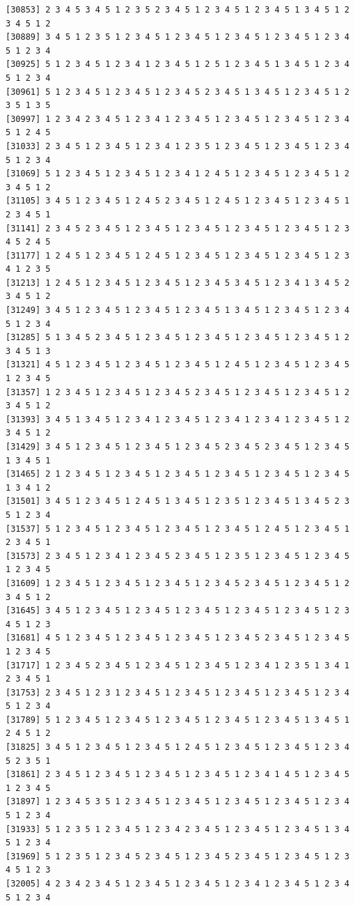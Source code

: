 \documentclass[
  english,
]{book}
\begin{document}
\begin{verbatim}
[30853] 2 3 4 5 3 4 5 1 2 3 5 2 3 4 5 1 2 3 4 5 1 2 3 4 5 1 3 4 5 1 2 3 4 5 1 2
[30889] 3 4 5 1 2 3 5 1 2 3 4 5 1 2 3 4 5 1 2 3 4 5 1 2 3 4 5 1 2 3 4 5 1 2 3 4
[30925] 5 1 2 3 4 5 1 2 3 4 1 2 3 4 5 1 2 5 1 2 3 4 5 1 3 4 5 1 2 3 4 5 1 2 3 4
[30961] 5 1 2 3 4 5 1 2 3 4 5 1 2 3 4 5 2 3 4 5 1 3 4 5 1 2 3 4 5 1 2 3 5 1 3 5
[30997] 1 2 3 4 2 3 4 5 1 2 3 4 1 2 3 4 5 1 2 3 4 5 1 2 3 4 5 1 2 3 4 5 1 2 4 5
[31033] 2 3 4 5 1 2 3 4 5 1 2 3 4 1 2 3 5 1 2 3 4 5 1 2 3 4 5 1 2 3 4 5 1 2 3 4
[31069] 5 1 2 3 4 5 1 2 3 4 5 1 2 3 4 1 2 4 5 1 2 3 4 5 1 2 3 4 5 1 2 3 4 5 1 2
[31105] 3 4 5 1 2 3 4 5 1 2 4 5 2 3 4 5 1 2 4 5 1 2 3 4 5 1 2 3 4 5 1 2 3 4 5 1
[31141] 2 3 4 5 2 3 4 5 1 2 3 4 5 1 2 3 4 5 1 2 3 4 5 1 2 3 4 5 1 2 3 4 5 2 4 5
[31177] 1 2 4 5 1 2 3 4 5 1 2 4 5 1 2 3 4 5 1 2 3 4 5 1 2 3 4 5 1 2 3 4 1 2 3 5
[31213] 1 2 4 5 1 2 3 4 5 1 2 3 4 5 1 2 3 4 5 3 4 5 1 2 3 4 1 3 4 5 2 3 4 5 1 2
[31249] 3 4 5 1 2 3 4 5 1 2 3 4 5 1 2 3 4 5 1 3 4 5 1 2 3 4 5 1 2 3 4 5 1 2 3 4
[31285] 5 1 3 4 5 2 3 4 5 1 2 3 4 5 1 2 3 4 5 1 2 3 4 5 1 2 3 4 5 1 2 3 4 5 1 3
[31321] 4 5 1 2 3 4 5 1 2 3 4 5 1 2 3 4 5 1 2 4 5 1 2 3 4 5 1 2 3 4 5 1 2 3 4 5
[31357] 1 2 3 4 5 1 2 3 4 5 1 2 3 4 5 2 3 4 5 1 2 3 4 5 1 2 3 4 5 1 2 3 4 5 1 2
[31393] 3 4 5 1 3 4 5 1 2 3 4 1 2 3 4 5 1 2 3 4 1 2 3 4 1 2 3 4 5 1 2 3 4 5 1 2
[31429] 3 4 5 1 2 3 4 5 1 2 3 4 5 1 2 3 4 5 2 3 4 5 2 3 4 5 1 2 3 4 5 1 3 4 5 1
[31465] 2 1 2 3 4 5 1 2 3 4 5 1 2 3 4 5 1 2 3 4 5 1 2 3 4 5 1 2 3 4 5 1 3 4 1 2
[31501] 3 4 5 1 2 3 4 5 1 2 4 5 1 3 4 5 1 2 3 5 1 2 3 4 5 1 3 4 5 2 3 5 1 2 3 4
[31537] 5 1 2 3 4 5 1 2 3 4 5 1 2 3 4 5 1 2 3 4 5 1 2 4 5 1 2 3 4 5 1 2 3 4 5 1
[31573] 2 3 4 5 1 2 3 4 1 2 3 4 5 2 3 4 5 1 2 3 5 1 2 3 4 5 1 2 3 4 5 1 2 3 4 5
[31609] 1 2 3 4 5 1 2 3 4 5 1 2 3 4 5 1 2 3 4 5 2 3 4 5 1 2 3 4 5 1 2 3 4 5 1 2
[31645] 3 4 5 1 2 3 4 5 1 2 3 4 5 1 2 3 4 5 1 2 3 4 5 1 2 3 4 5 1 2 3 4 5 1 2 3
[31681] 4 5 1 2 3 4 5 1 2 3 4 5 1 2 3 4 5 1 2 3 4 5 2 3 4 5 1 2 3 4 5 1 2 3 4 5
[31717] 1 2 3 4 5 2 3 4 5 1 2 3 4 5 1 2 3 4 5 1 2 3 4 1 2 3 5 1 3 4 1 2 3 4 5 1
[31753] 2 3 4 5 1 2 3 1 2 3 4 5 1 2 3 4 5 1 2 3 4 5 1 2 3 4 5 1 2 3 4 5 1 2 3 4
[31789] 5 1 2 3 4 5 1 2 3 4 5 1 2 3 4 5 1 2 3 4 5 1 2 3 4 5 1 3 4 5 1 2 4 5 1 2
[31825] 3 4 5 1 2 3 4 5 1 2 3 4 5 1 2 4 5 1 2 3 4 5 1 2 3 4 5 1 2 3 4 5 2 3 5 1
[31861] 2 3 4 5 1 2 3 4 5 1 2 3 4 5 1 2 3 4 5 1 2 3 4 1 4 5 1 2 3 4 5 1 2 3 4 5
[31897] 1 2 3 4 5 3 5 1 2 3 4 5 1 2 3 4 5 1 2 3 4 5 1 2 3 4 5 1 2 3 4 5 1 2 3 4
[31933] 5 1 2 3 5 1 2 3 4 5 1 2 3 4 2 3 4 5 1 2 3 4 5 1 2 3 4 5 1 3 4 5 1 2 3 4
[31969] 5 1 2 3 5 1 2 3 4 5 2 3 4 5 1 2 3 4 5 2 3 4 5 1 2 3 4 5 1 2 3 4 5 1 2 3
[32005] 4 2 3 4 2 3 4 5 1 2 3 4 5 1 2 3 4 5 1 2 3 4 1 2 3 4 5 1 2 3 4 5 1 2 3 4

\end{verbatim}
\end{document}
